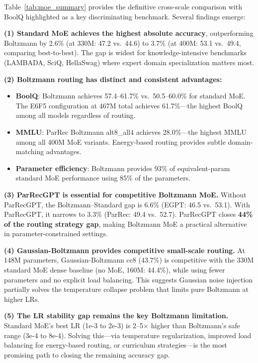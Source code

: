 \documentclass[oneside]{article}
\begin{document}
Table~\ref{tab:moe_summary} provides the definitive cross-scale comparison with BoolQ highlighted as a key discriminating benchmark. Several findings emerge:

\textbf{(1) Standard MoE achieves the highest absolute accuracy}, outperforming Boltzmann by 2.6\% (at 330M: 47.2 vs.\ 44.6) to 3.7\% (at 400M: 53.1 vs.\ 49.4, comparing best-to-best). The gap is widest for knowledge-intensive benchmarks (LAMBADA, SciQ, HellaSwag) where expert domain specialization matters most.

\textbf{(2) Boltzmann routing has distinct and consistent advantages:}
\begin{itemize}
    \item \textbf{BoolQ}: Boltzmann achieves 57.4--61.7\% vs.\ 50.5--60.0\% for standard MoE. The E6F5 configuration at 467M total achieves 61.7\%---the highest BoolQ among all models regardless of routing.
    \item \textbf{MMLU}: ParRec Boltzmann alt8\_all4 achieves 28.0\%---the highest MMLU among all 400M MoE variants. Energy-based routing provides subtle domain-matching advantages.
    \item \textbf{Parameter efficiency}: Boltzmann provides 93\% of equivalent-param standard MoE performance using 85\% of the parameters.
\end{itemize}

\textbf{(3) ParRecGPT is essential for competitive Boltzmann MoE.} Without ParRecGPT, the Boltzmann--Standard gap is 6.6\% (EGPT: 46.5 vs.\ 53.1). With ParRecGPT, it narrows to 3.3\% (ParRec: 49.4 vs.\ 52.7). ParRecGPT closes \textbf{44\% of the routing strategy gap}, making Boltzmann MoE a practical alternative in parameter-constrained settings.

\textbf{(4) Gaussian-Boltzmann provides competitive small-scale routing.} At 148M parameters, Gaussian-Boltzmann cc8 (43.7\%) is competitive with the 330M standard MoE dense baseline (no MoE, 160M: 44.4\%), while using fewer parameters and no explicit load balancing. This suggests Gaussian noise injection partially solves the temperature collapse problem that limits pure Boltzmann at higher LRs.

\textbf{(5) The LR stability gap remains the key Boltzmann limitation.} Standard MoE's best LR (1e-3 to 2e-3) is 2--5$\times$ higher than Boltzmann's safe range (3e-4 to 8e-4). Solving this---via temperature regularization, improved load balancing for energy-based routing, or curriculum strategies---is the most promising path to closing the remaining accuracy gap.
\end{document}
